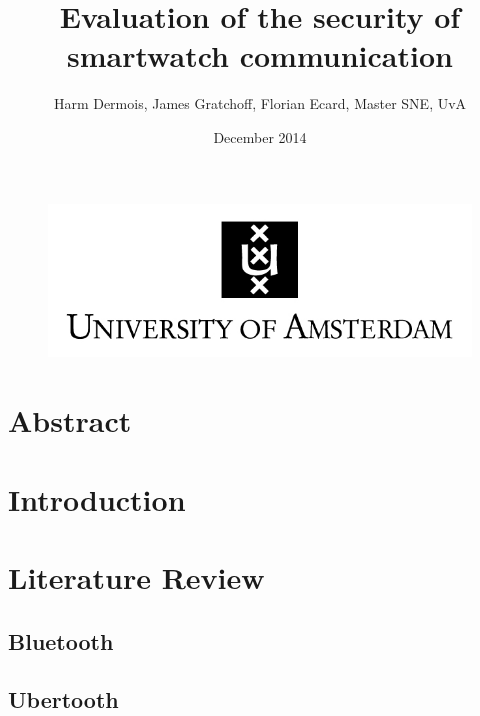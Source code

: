\documentclass{article}
\begin{document}
 



\begin{figure}[!h]
 	\begin{center}
		\huge \title{Evaluation of the security of smartwatch communication}
		\author{Harm Dermois, James Gratchoff, Florian Ecard,  Master SNE, UvA} 
		\date{December 2014\\}
	\maketitle 
		\includegraphics{uva.jpeg}
		\label{sec:uva}
	\end{center}
\end{figure}

\newpage

\newcommand{\pend}{
 \\ 
\indent}

\section*{Abstract}
 

\newpage

\tableofcontents

\newpage



\section{Introduction}
\newpage
\section{Literature Review}

	\subsection{Bluetooth}
	\subsection{Ubertooth}
\end{document}
